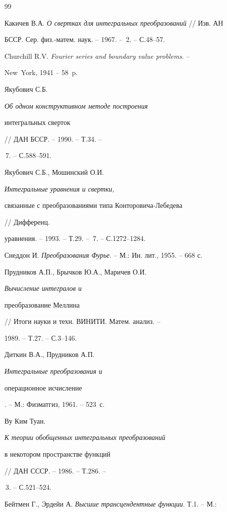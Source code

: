 \begin{thebibliography}{99}







Какичев В.А. {\em О свертках для интегральных преобразований} // Изв. АН


БССР. Сер. физ.-матем. наук. -- 1967. -- \No\,2. -- С.48--57.




Churchill R.V. {\em Fourier series and boundary value problems}. --


New~York, 1941 -- 58~p.




Якубович С.Б. {\em Об одном конструктивном методе построения


интегральных сверток} // ДАН БССР. -- 1990. -- Т.34. --


\No\,7. -- С.588--591.




Якубович С.Б., Мошинский О.И. {\em Интегральные уравнения и свертки,


связанные с преобразованиями типа Конторовича-Лебедева} // Дифференц.


уравнения. -- 1993. -- Т.29. -- \No\,7. -- С.1272--1284.




Снеддон И. {\em Преобразования Фурье}. -- М.: Ин. лит., 1955. -- 668 с.




Прудников А.П., Брычков Ю.А., Маричев О.И. {\em Вычисление интегралов и


преобразование Меллина} // Итоги науки и техн. ВИНИТИ. Матем. анализ. --


1989. -- Т.27. -- С.3--146.




Диткин В.А., Прудников А.П. {\em Интегральные преобразования и


операционное исчисление}. -- М.: Физматгиз, 1961. -- 523~с.




Ву Ким Туан. {\em К теории обобщенных интегральных преобразований


в некотором пространстве функций} // ДАН СССР. -- 1986. -- Т.286. --


\No\,3. -- С.521--524.




Бейтмен Г., Эрдейи А. {\em Высшие трансцендентные функции}. Т.1. -- М.:



\end{thebibliography}
